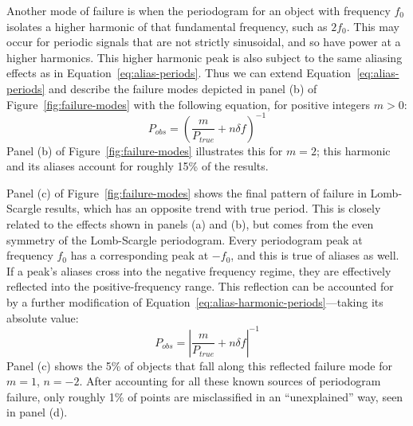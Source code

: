 \documentclass[preprint]{aastex}
\newcommand{\fig}[1]{Figure~\ref{fig:#1}}
\newcommand{\Eq}[1]{Equation~\ref{eq:#1}}
\newcommand{\eq}[1]{\Eq{#1}}
\newcommand{\eqlabel}[1]{\label{eq:#1}}
\begin{document}
Another mode of failure is when the periodogram for an object with frequency
$f_0$ isolates a higher harmonic of that fundamental frequency, such as $2f_0$.
This may occur for periodic signals that are not strictly sinusoidal, and so
have power at a higher harmonics.
This higher harmonic peak is also subject to the same aliasing
effects as in \eq{alias-periods}.
Thus we can extend \eq{alias-periods} and describe the failure modes depicted
in panel (b) of \fig{failure-modes} with the following equation,
for positive integers $m > 0$:
\begin{equation}
  P_{obs} = \left(\frac{m}{P_{true}} + n\delta f\right)^{-1}
  \eqlabel{alias-harmonic-periods}
\end{equation}
Panel (b) of \fig{failure-modes} illustrates this for $m=2$; this harmonic and
its aliases account for roughly 15\% of the results.

Panel (c) of \fig{failure-modes} shows the final pattern of failure in
Lomb-Scargle results, which has an opposite trend with true period.
This is closely related to the effects shown in panels (a) and (b),
but comes from the even symmetry of the Lomb-Scargle periodogram.
Every periodogram peak at frequency $f_0$ has a corresponding peak at $-f_0$,
and this is true of aliases as well.
If a peak's aliases cross into the negative frequency regime, they are
effectively reflected into the positive-frequency range.
This reflection can be accounted for by a further modification of
\eq{alias-harmonic-periods}---taking its absolute value:
\begin{equation}
  P_{obs} = \left|\frac{m}{P_{true}} + n\delta f\right|^{-1}
  \eqlabel{failure-modes}
\end{equation}
Panel (c) shows the 5\% of objects that fall along this reflected
failure mode for $m=1$, $n=-2$.
After accounting for all these known sources of periodogram failure,
only roughly 1\% of points are misclassified in an ``unexplained'' way,
seen in panel (d).
\end{document}
